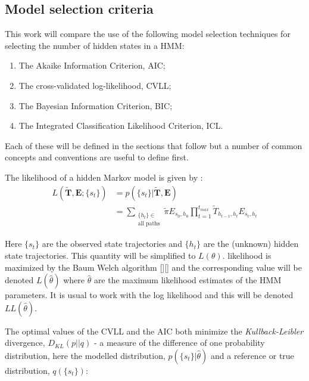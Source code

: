 \subsection{Model selection criteria}

This work will compare the use of the following model selection techniques for selecting the number of hidden states in a HMM: 
\begin{enumerate}
    \item The Akaike Information Criterion, AIC; 
    \item The cross-validated log-likelihood, CVLL; 
    \item The Bayesian Information Criterion, BIC; 
    \item The Integrated Classification Likelihood Criterion, ICL.
\end{enumerate}

Each of these will be defined in the sections that follow but a number of common concepts and conventions are useful to define first. 

The likelihood of  a hidden Markov model is given by \cite{noeProjectedHiddenMarkov2013a}: 
\begin{equation}\label{eqn:obs_lik_full}
\begin{split}
    L(\tilde{\mathbf{T}}, \mathbf{E}; \{s_t\}) & = p(\{s_t\} | \tilde{\mathbf{T}}, \mathbf{E}) \\
    & = \sum_{\substack{\{h_t\} \in \\ \text{all paths}}} \tilde{\pi}E_{s_{0}, h_{0}}\prod_{t=1}^{t_{max}}\tilde{T}_{h_{t-1}, h_t}E_{s_t, h_t}    
\end{split}
\end{equation}

Here $\{s_t\}$ are the observed state trajectories and $\{h_t\}$ are the (unknown) hidden state trajectories. This quantity will be simplified to $L(\theta)$. likelihood is maximized by the Baum Welch algorithm [][] and the corresponding value will be denoted $L(\hat{\theta})$ where $\hat{\theta}$ are the maximum likelihood estimates of the HMM parameters. It is usual to work with the log likelihood and this will be denoted $LL(\hat{\theta})$. 

The optimal values of the CVLL and the AIC both minimize the \emph{Kullback-Leibler} divergence, $D_{KL}(p||q)$ - a measure of the difference of one probability distribution, here the modelled distribution,  $p(\{s_t\} | \hat{\theta})$  and a reference or true distribution, $q(\{s_t\})$: 

